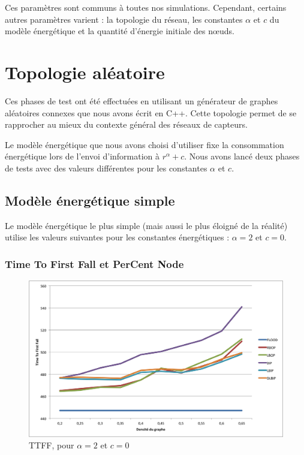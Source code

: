 Ces paramètres sont communs à toutes nos simulations. Cependant, certains autres paramètres varient : la topologie du réseau, les constantes $\alpha$ et $c$ du modèle énergétique et la quantité d'énergie initiale des nœuds.


\section{Topologie aléatoire}
Ces phases de test ont été effectuées en utilisant un générateur de graphes aléatoires connexes que nous avons écrit en C++. Cette topologie permet de se rapprocher au mieux du contexte général des réseaux de capteurs.

Le modèle énergétique que nous avons choisi d'utiliser fixe la consommation énergétique lors de l'envoi d'information à $ r^\alpha + c $. Nous avons lancé deux phases de tests avec des valeurs différentes pour les constantes $\alpha$ et $c$.

\subsection{Modèle énergétique simple}
Le modèle énergétique le plus simple (mais aussi le plus éloigné de la réalité) utilise les valeurs suivantes pour les constantes énergétiques : $\alpha = 2$ et $c = 0$.

\subsubsection{Time To First Fall et PerCent Node}


\begin{figure}[H]
\begin{bigcenter}
\includegraphics[scale=0.75]{Simus/ttff_2_0}
\caption{TTFF, pour $\alpha = 2$ et $c = 0$}
\label{TTFF1}
\end{bigcenter}
\end{figure}

